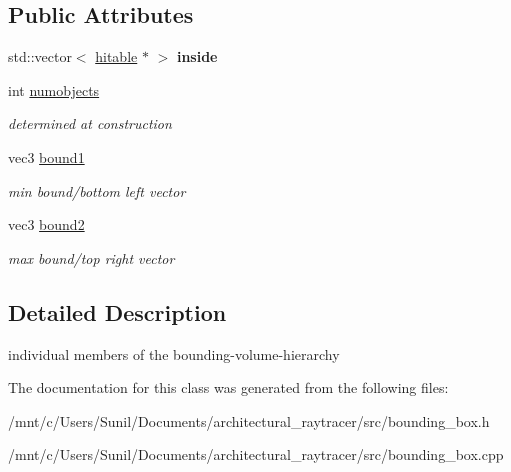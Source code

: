 \subsection*{Public Attributes}
\begin{DoxyCompactItemize}
\item 
\mbox{\label{classbounding__box_ad73d9a860b3da08a814cfc1d38d26eed}} 
std\+::vector$<$ \hyperlink{classhitable}{hitable} $\ast$ $>$ {\bfseries inside}
\item 
\mbox{\label{classbounding__box_a0a5d20a1e613f37efb0f2f5aeae24a82}} 
int \hyperlink{classbounding__box_a0a5d20a1e613f37efb0f2f5aeae24a82}{numobjects}
\begin{DoxyCompactList}\small\item\em determined at construction \end{DoxyCompactList}\item 
\mbox{\label{classbounding__box_a759576bfdf13821ba444e7f750a7fa48}} 
vec3 \hyperlink{classbounding__box_a759576bfdf13821ba444e7f750a7fa48}{bound1}
\begin{DoxyCompactList}\small\item\em min bound/bottom left vector \end{DoxyCompactList}\item 
\mbox{\label{classbounding__box_a891b89fb85b53542d0f0b9f6c94f7624}} 
vec3 \hyperlink{classbounding__box_a891b89fb85b53542d0f0b9f6c94f7624}{bound2}
\begin{DoxyCompactList}\small\item\em max bound/top right vector \end{DoxyCompactList}\end{DoxyCompactItemize}


\subsection{Detailed Description}
individual members of the bounding-\/volume-\/hierarchy 

The documentation for this class was generated from the following files\+:\begin{DoxyCompactItemize}
\item 
/mnt/c/\+Users/\+Sunil/\+Documents/architectural\+\_\+raytracer/src/bounding\+\_\+box.\+h\item 
/mnt/c/\+Users/\+Sunil/\+Documents/architectural\+\_\+raytracer/src/bounding\+\_\+box.\+cpp\end{DoxyCompactItemize}
